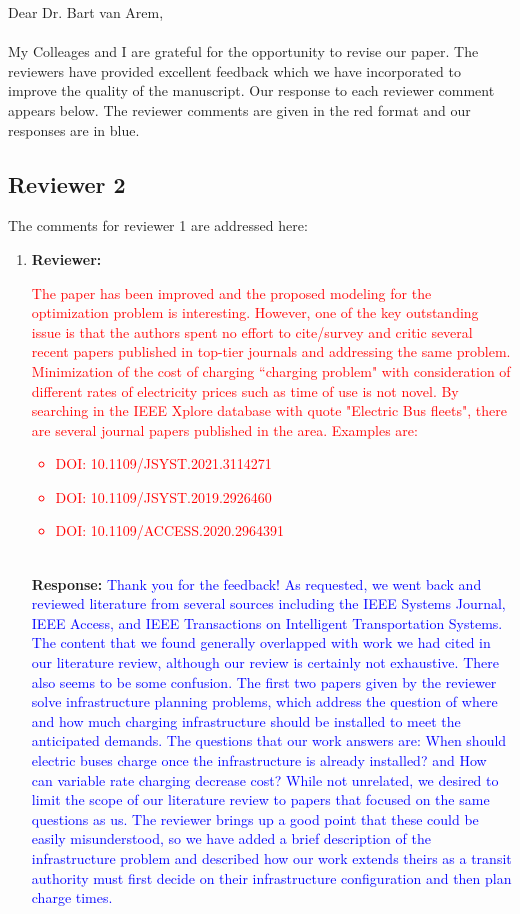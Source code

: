 \documentclass{article}
\newcommand\formatfeedback[2]
{%
	\textbf{Reviewer:} \textcolor{red}{#1} 
	\leavevmode\\[0.1in] \textbf{Response:} \textcolor{blue}{#2}
}
\begin{document}
\noindent Dear Dr. Bart van Arem, \\ \\
My Colleages and I are grateful for the opportunity to revise our paper. The reviewers have provided excellent feedback which we have incorporated to improve the quality of the manuscript. Our response to each reviewer comment appears below. The reviewer comments are given in the red format and our responses are in blue.

\subsection*{Reviewer 2}
The comments for reviewer 1 are addressed here:
\begin{enumerate}
	\item \formatfeedback{The paper has been improved and the proposed modeling for the optimization problem is interesting. However, one of the key outstanding issue is that the authors spent no effort to cite/survey and critic several recent papers published in top-tier journals and addressing the same problem. Minimization of the cost of charging ``charging problem" with consideration of different rates of electricity prices such as time of use is not novel. By searching in the IEEE Xplore database with quote "Electric Bus fleets", there are several journal papers published in the area. Examples are:
\begin{itemize}
	\item DOI: 10.1109/JSYST.2021.3114271
	\item DOI: 10.1109/JSYST.2019.2926460
	\item DOI: 10.1109/ACCESS.2020.2964391
\end{itemize}
}{Thank you for the feedback! As requested, we went back and reviewed literature from several sources including the IEEE Systems Journal, IEEE Access, and IEEE Transactions on Intelligent Transportation Systems. The content that we found generally overlapped with work we had cited in our literature review, although our review is certainly not exhaustive. There also seems to be some confusion. The first two papers given by the reviewer solve infrastructure planning problems, which address the question of where and how much charging infrastructure should be installed to meet the anticipated demands. The questions that our work answers are: When should electric buses charge once the infrastructure is already installed? and How can variable rate charging decrease cost? While not unrelated, we desired to limit the scope of our literature review to papers that focused on the same questions as us. The reviewer brings up a good point that these could be easily misunderstood, so we have added a brief description of the infrastructure problem and described how our work extends theirs as a transit authority must first decide on their infrastructure configuration and then plan charge times.}

\end{enumerate}
\end{document}
